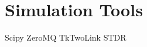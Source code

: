 \hypertarget{Chap:SimTools}{%
\section{Simulation Tools}\label{Chap:SimTools}}

Scipy ZeroMQ TkTwoLink STDR
